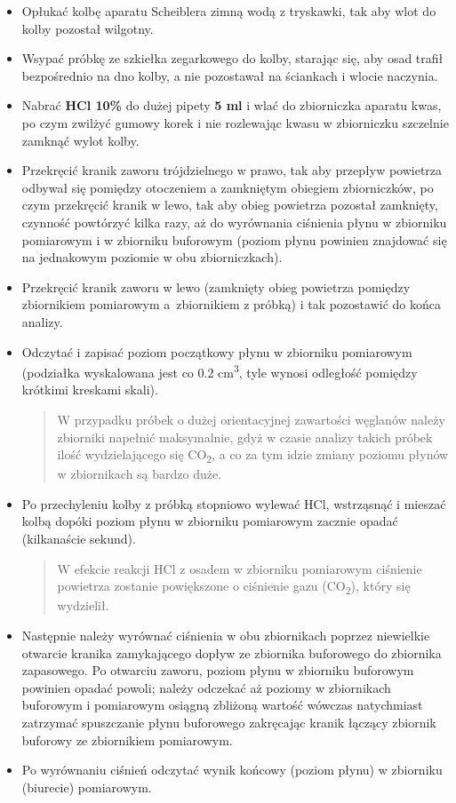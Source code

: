 \documentclass[
  letterpaper,
  DIV=11,
  numbers=noendperiod]{scrreprt}
\begin{document}
\begin{itemize}
\item
  Opłukać kolbę aparatu Scheiblera zimną wodą z tryskawki, tak aby wlot
  do kolby pozostał wilgotny.
\item
  Wsypać próbkę ze szkiełka zegarkowego do kolby, starając się, aby osad
  trafił bezpośrednio na dno kolby, a nie pozostawał na ściankach i
  wlocie naczynia.
\item
  Nabrać \textbf{HCl 10\%} do dużej pipety \textbf{5 ml} i wlać do
  zbiorniczka aparatu kwas, po czym zwilżyć gumowy korek i nie
  rozlewając kwasu w zbiorniczku szczelnie zamknąć wylot kolby.
\item
  Przekręcić kranik zaworu trójdzielnego w prawo, tak aby przepływ
  powietrza odbywał się pomiędzy otoczeniem a zamkniętym obiegiem
  zbiorniczków, po czym przekręcić kranik w lewo, tak aby obieg
  powietrza pozostał zamknięty, czynność powtórzyć kilka razy, aż do
  wyrównania ciśnienia płynu w zbiorniku pomiarowym i w zbiorniku
  buforowym (poziom płynu powinien znajdować się na jednakowym poziomie
  w obu zbiorniczkach).
\item
  Przekręcić kranik zaworu w lewo (zamknięty obieg powietrza pomiędzy
  zbiornikiem pomiarowym a~zbiornikiem z próbką) i tak pozostawić do
  końca analizy.
\item
  Odczytać i zapisać poziom początkowy płynu w zbiorniku pomiarowym
  (podziałka wyskalowana jest co 0.2 cm\textsuperscript{3}, tyle wynosi
  odległość pomiędzy krótkimi kreskami skali).

  \begin{quote}
  W przypadku próbek o dużej orientacyjnej zawartości węglanów należy
  zbiorniki napełnić maksymalnie, gdyż w czasie analizy takich próbek
  ilość wydzielającego się CO\textsubscript{2}, a co za tym idzie zmiany
  poziomu płynów w zbiornikach są bardzo duże.
  \end{quote}
\item
  Po przechyleniu kolby z próbką stopniowo wylewać HCl, wstrząsnąć i
  mieszać kolbą dopóki poziom płynu w zbiorniku pomiarowym zacznie
  opadać (kilkanaście sekund).

  \begin{quote}
  W efekcie reakcji HCl z osadem w zbiorniku pomiarowym ciśnienie
  powietrza zostanie powiększone o ciśnienie gazu (CO\textsubscript{2}),
  który się wydzielił.
  \end{quote}
\item
  Następnie należy wyrównać ciśnienia w obu zbiornikach poprzez
  niewielkie otwarcie kranika zamykającego dopływ ze zbiornika
  buforowego do zbiornika zapasowego. Po otwarciu zaworu, poziom płynu w
  zbiorniku buforowym powinien opadać powoli; należy odczekać aż poziomy
  w zbiornikach buforowym i pomiarowym osiągną zbliżoną wartość wówczas
  natychmiast zatrzymać spuszczanie płynu buforowego zakręcając kranik
  łączący zbiornik buforowy ze zbiornikiem pomiarowym.
\item
  Po wyrównaniu ciśnień odczytać wynik końcowy (poziom płynu) w
  zbiorniku (biurecie) pomiarowym.


\end{itemize}
\end{document}
